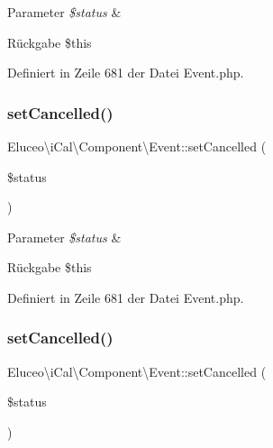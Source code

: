 \begin{DoxyParams}{Parameter}
{\em \$status} & \\
\hline
\end{DoxyParams}
\begin{DoxyReturn}{Rückgabe}
\$this 
\end{DoxyReturn}


Definiert in Zeile 681 der Datei Event.\+php.

\mbox{\label{class_eluceo_1_1i_cal_1_1_component_1_1_event_a1a81af119a481d672fe0f4ad2610a502}} 
\subsubsection{\texorpdfstring{set\+Cancelled()}{setCancelled()}\hspace{0.1cm}{\footnotesize\ttfamily [2/3]}}
{\footnotesize\ttfamily Eluceo\textbackslash{}i\+Cal\textbackslash{}\+Component\textbackslash{}\+Event\+::set\+Cancelled (\begin{DoxyParamCaption}\item[{}]{\$status }\end{DoxyParamCaption})}


\begin{DoxyParams}{Parameter}
{\em \$status} & \\
\hline
\end{DoxyParams}
\begin{DoxyReturn}{Rückgabe}
\$this 
\end{DoxyReturn}


Definiert in Zeile 681 der Datei Event.\+php.

\mbox{\label{class_eluceo_1_1i_cal_1_1_component_1_1_event_a1a81af119a481d672fe0f4ad2610a502}} 
\subsubsection{\texorpdfstring{set\+Cancelled()}{setCancelled()}\hspace{0.1cm}{\footnotesize\ttfamily [3/3]}}
{\footnotesize\ttfamily Eluceo\textbackslash{}i\+Cal\textbackslash{}\+Component\textbackslash{}\+Event\+::set\+Cancelled (\begin{DoxyParamCaption}\item[{}]{\$status }\end{DoxyParamCaption})}


